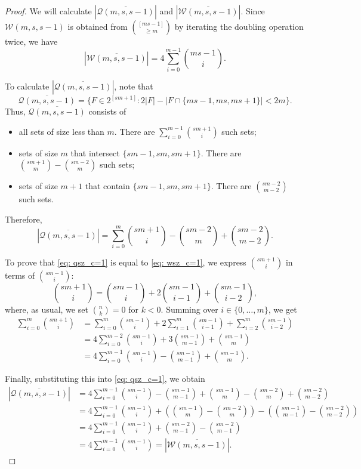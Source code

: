 \documentclass[12pt,a4paper]{article}
\begin{document}
\begin{proof}
We will calculate $|\overline{\mathcal{Q}(m, s, s-1)}|$ and $|\overline{\mathcal{W}(m, s, s-1)}|$.
Since $\mathcal{W}(m, s, s-1)$ is obtained from ${[ms - 1] \choose \geq m}$ by iterating the doubling operation twice, we have
\begin{equation} \label{eq: wsz_c=1}
    |\overline{\mathcal{W}(m, s, s-1)}| = 4\sum_{i=0}^{m-1}{ms-1 \choose i}.
\end{equation}

To calculate $|\overline{\mathcal{Q}(m, s, s-1)}|$, note that
\[
\overline{\mathcal{Q}(m, s, s-1)} = \{F \in 2^{[sm+1]}: 2|F| - |F \cap \{ms-1, ms, ms+1\}| < 2m \}.
\]
Thus, $\overline{\mathcal{Q}(m, s, s-1)}$ consists of
\begin{itemize}
    \item all sets of size less than $m$. There are $\sum_{i=0}^{m - 1}{sm+1 \choose i}$ such sets;
    \item sets of size $m$ that intersect $\{sm - 1, sm, sm+1\}$. There are ${sm + 1 \choose m} - {sm - 2 \choose m}$ such sets;
    \item sets of size $m + 1$ that contain $\{sm - 1, sm, sm + 1\}$. There are ${sm - 2 \choose m - 2}$ such sets.
\end{itemize}

Therefore,
\begin{equation} \label{eq: qsz_c=1}
    |\overline{\mathcal{Q}(m, s, s-1)}|
    = \sum_{i=0}^{m}{sm+1 \choose i} - {sm - 2 \choose m} + {sm - 2 \choose m - 2}.
\end{equation}

To prove that \eqref{eq: qsz_c=1} is equal to \eqref{eq: wsz_c=1}, we express ${sm+1 \choose i}$ in terms of ${sm-1 \choose i}$:
\[
{sm+1 \choose i} = {sm-1 \choose i} + 2 {sm-1 \choose i - 1} + {sm-1 \choose i - 2},
\]
where, as usual, we set ${n \choose k} = 0$ for $k < 0$. Summing over $i \in \{0, \ldots, m\}$, we get
\begin{align*}
    \sum_{i=0}^{m}{sm+1 \choose i}
    &= \sum_{i=0}^{m}{sm-1 \choose i} + 2\sum_{i=1}^{m}{sm-1 \choose i-1} + \sum_{i=2}^{m}{sm-1 \choose i-2} \\
    &= 4\sum_{i=0}^{m-2}{sm-1 \choose i} + 3{sm-1 \choose m-1} + {sm-1 \choose m} \\
    &= 4\sum_{i=0}^{m-1}{sm-1 \choose i} - {sm-1 \choose m-1} + {sm-1 \choose m}.
\end{align*}

Finally, substituting this into \eqref{eq: qsz_c=1}, we obtain
{\small
\begin{align*}
    |\overline{\mathcal{Q}(m, s, s-1)}|
    &= 4\sum_{i=0}^{m-1}{sm-1 \choose i} - {sm-1 \choose m-1} + {sm-1 \choose m} - {sm - 2 \choose m} + {sm - 2 \choose m - 2} \\
    &= 4\sum_{i=0}^{m-1}{sm-1 \choose i} + \left({sm-1 \choose m} - {sm - 2 \choose m}\right) - \left({sm-1 \choose m-1} - {sm - 2 \choose m - 2}\right) \\
    &= 4\sum_{i=0}^{m-1}{sm-1 \choose i} + {sm-2 \choose m-1} - {sm-2 \choose m-1} \\
    &= 4\sum_{i=0}^{m-1}{sm-1 \choose i}
     = |\overline{\mathcal{W}(m, s, s-1)}|.
\end{align*}
}
\end{proof}
\end{document}
